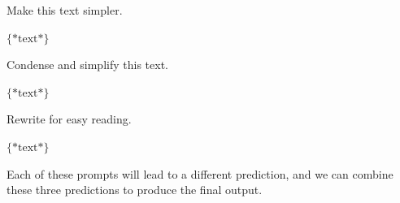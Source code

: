 \vspace{0.5em}
\begin{tcolorbox}

\begingroup
\setlength{\leftskip}{2em}
\setlength{\rightskip}{2em}

Make this text simpler.

\vspace{0.2em}

$\{*\mathrm{text}*\}$

\underline{\hspace{2em}}

\endgroup

\end{tcolorbox}
\vspace{0.5em}

\vspace{0.5em}
\begin{tcolorbox}

\begingroup
\setlength{\leftskip}{2em}
\setlength{\rightskip}{2em}

Condense and simplify this text.

\vspace{0.2em}

$\{*\mathrm{text}*\}$

\underline{\hspace{2em}}

\endgroup

\end{tcolorbox}
\vspace{0.5em}

\vspace{0.5em}
\begin{tcolorbox}

\begingroup
\setlength{\leftskip}{2em}
\setlength{\rightskip}{2em}

Rewrite for easy reading.

\vspace{0.2em}

$\{*\mathrm{text}*\}$

\underline{\hspace{2em}}

\endgroup

\end{tcolorbox}
\vspace{0.5em}

\noindent Each of these prompts will lead to a different prediction, and we can combine these three predictions to produce the final output.

